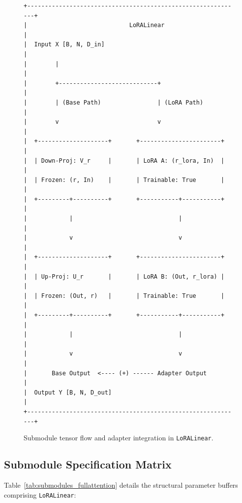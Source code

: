 {\begin{figure}[H]
\centering
\begin{verbatim}
+-------------------------------------------------------------+
|                             LoRALinear                      |
|  Input X [B, N, D_in]                                       |
|        |                                                    |
|        +----------------------------+                       |
|        | (Base Path)                | (LoRA Path)           |
|        v                            v                       |
|  +--------------------+       +-----------------------+     |
|  | Down-Proj: V_r     |       | LoRA A: (r_lora, In)  |     |
|  | Frozen: (r, In)    |       | Trainable: True       |     |
|  +---------+----------+       +-----------+-----------+     |
|            |                              |                 |
|            v                              v                 |
|  +--------------------+       +-----------------------+     |
|  | Up-Proj: U_r       |       | LoRA B: (Out, r_lora) |     |
|  | Frozen: (Out, r)   |       | Trainable: True       |     |
|  +---------+----------+       +-----------+-----------+     |
|            |                              |                 |
|            v                              v                 |
|       Base Output  <---- (+) ------ Adapter Output          |
|  Output Y [B, N, D_out]                                     |
+-------------------------------------------------------------+
\end{verbatim}
\caption{Submodule tensor flow and adapter integration in \texttt{LoRALinear}.}
\end{figure}

\subsection{Submodule Specification Matrix}
Table~\ref{tab:submodules_fullattention} details the structural parameter buffers comprising \texttt{LoRALinear}:

}
